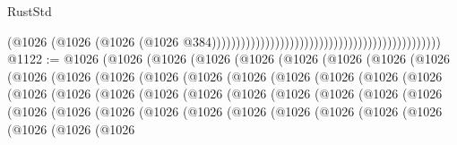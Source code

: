\begin{lexlean}{RustStd}
\begin{coremodule}
{\begin{coremodule}
{{{{{{{{{{{{{{{{{{{{{{{{{{{{{{{{{{{{{                                                                                          (@1026
                                                                                            (@1026
                                                                                              (@1026
                                                                                                (@1026
                                                                                                  @384)))))))))))))))))))))))))))))))))))))))))))))))
@1122 := @1026
    (@1026
      (@1026
        (@1026
          (@1026
            (@1026
              (@1026
                (@1026
                  (@1026
                    (@1026
                      (@1026
                        (@1026
                          (@1026
                            (@1026
                              (@1026
                                (@1026
                                  (@1026
                                    (@1026
                                      (@1026
                                        (@1026
                                          (@1026
                                            (@1026
                                              (@1026
                                                (@1026
                                                  (@1026
                                                    (@1026
                                                      (@1026
                                                        (@1026
                                                          (@1026
                                                            (@1026
                                                              (@1026
                                                                (@1026
                                                                  (@1026
                                                                    (@1026
                                                                      (@1026
                                                                        (@1026
                                                                          (@1026
                                                                            (@1026
                                                                              (@1026
                                                                                (@1026
                                                                                  (@1026
                                                                                    (@1026
}}}}}}}}}}}}}}}}}}}}}}}}}}}}}}}}}}}}}
\end{coremodule}}
\end{coremodule}
\end{lexlean}
